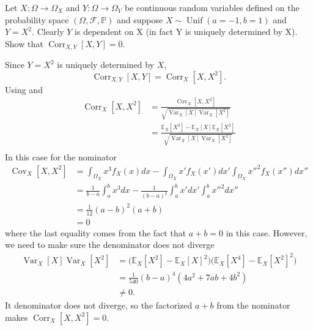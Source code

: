 \begin{example}
	Let $X:\Omega \to \Omega_X$ and $Y:\Omega\to \Omega_Y$ be continuous random variables defined on the probability space $(\Omega,\mathcal{F},\mathbb{P})$ and suppose $X\sim \operatorname{Unif}(a=-1, b=1)$ and $Y=X^2$. Clearly $Y$ is dependent on X (in fact Y is uniquely determined by X). Show that $\operatorname{Corr}_{X,Y}[X,Y]=0$.\newline
	
	Since $Y=X^2$ is uniquely determined by $X$,
	\begin{equation}
		\operatorname{Corr}_{X,Y}[X,Y] = \operatorname{Corr}_{X}[X,X^2].
	\end{equation}
	Using  and 
	\begin{equation}
		\begin{split}
			\operatorname{Corr}_{X}[X,X^2] & = \frac{\operatorname{Cov}_{X}[X,X^2]}{\sqrt{\operatorname{Var}_X[X]\operatorname{Var}_X[X^2]}}\\
			& = \frac{\mathbb{E}_{X}[X^3]-\mathbb{E}_X[X]\mathbb{E}_X[X^2]}{\sqrt{\operatorname{Var}_X[X]\operatorname{Var}_X[X^2]}}\\
		\end{split}
	\end{equation}
	In this case for the nominator
	\begin{equation}
		\begin{split}
			\operatorname{Cov}_{X}[X,X^2] &= \int_{\Omega_X} x^3 f_X(x) dx-\int_{\Omega_X} x'f_X(x') dx'\int_{\Omega_X} x''^2f_X(x'') dx''\\
			&= \frac{1}{b-a}\int_{a}^{b}x^3dx-\frac{1}{(b-a)^2}\int_{a}^{b} x' dx'\int_{a}^{b} x''^2 dx''\\
			&= \frac{1}{12}(a-b)^2(a+b)\\
			&=0
		\end{split}
	\end{equation}
	where the last equality comes from the fact that $a+b = 0$ in this case. However, we need to make sure the denominator does not diverge
	\begin{equation}
		\begin{split}
			\operatorname{Var}_X[X]\operatorname{Var}_X[X^2] & =\big(\mathbb{E}_X[X^2]-\mathbb{E}_X[X]^2\big) \big(\mathbb{E}_X[X^4]-\mathbb{E}_X[X^2]^2\big)\\
			& = \frac{1}{540}(b-a)^4(4a^2+7ab+4b^2)\\
			&\neq 0.
		\end{split}
	\end{equation}
	It denominator does not diverge, so the factorized $a+b$ from the nominator makes $\operatorname{Corr}_{X}[X,X^2]=0$.
\end{example}

